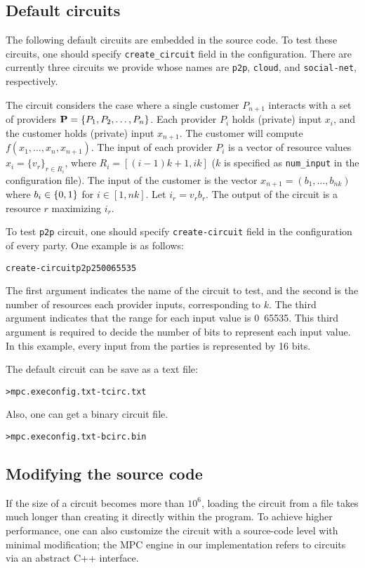 \documentclass{article}
\begin{document}
\subsection{Default circuits}\label{subsec:default_circuits}
The following default circuits are embedded in the source code.
To test these circuits, one should specify {\tt create\_circuit} field in
the configuration. There are currently three circuits we provide whose names
are {\tt p2p}, {\tt cloud}, and {\tt social-net}, respectively.

The circuit considers the case where a single customer $P_{n+1}$
interacts with a set of providers $\P = \{P_1, P_2, \ldots, P_n\}$.
Each provider $P_i$ holds (private) input $x_i$, and the customer
holds (private) input $x_{n+1}$.  The customer will compute $f(x_1,
\ldots, x_n, x_{n+1})$.
%
The input of each provider $P_i$ is a vector of resource values $x_i =
\{v_r\}_{r \in R_i}$, where $R_i = [(i-1)k+1, ik]$ ($k$ is specified
as {\tt num\_input} in the configuration file).
%
The input of the customer is the vector  $ x_{n+1} = (b_1, \ldots,
b_{nk})$ where $b_i \in \zo$ for $i \in [1,nk]$.
%
Let $i_r = v_r b_r$. The output of the circuit is a resource $r$
maximizing $i_r$.

To test {\tt p2p} circuit, one should specify {\tt create-circuit} field in 
the configuration of every party. One example is as follows:
\begin{alltt}
create-circuit p2p 2500 65535
\end{alltt}
The first argument indicates the name of the circuit to test, and the 
second is the number of resources each provider inputs, corresponding to $k$.
The third argument indicates that the range for each input value is 0~65535. 
This third argument is required to decide the number of bits to represent 
each input value. In this example, every input from the parties is represented 
by 16 bits.

The default circuit can be save as a text file:
\begin{alltt}
>mpc.exe config.txt -t circ.txt
\end{alltt}
Also, one can get a binary circuit file.
\begin{alltt}
>mpc.exe config.txt -b circ.bin
\end{alltt}

\subsection{Modifying the source code}\label{subsec:source_code}
If the size of a circuit becomes more than $10^6$, loading the circuit
from a file takes much longer than creating it directly within the
program.  To achieve higher performance, one can also customize the
circuit with a source-code level with minimal modification; the MPC
engine in our implementation refers to circuits via an abstract C++
interface.
\end{document}
